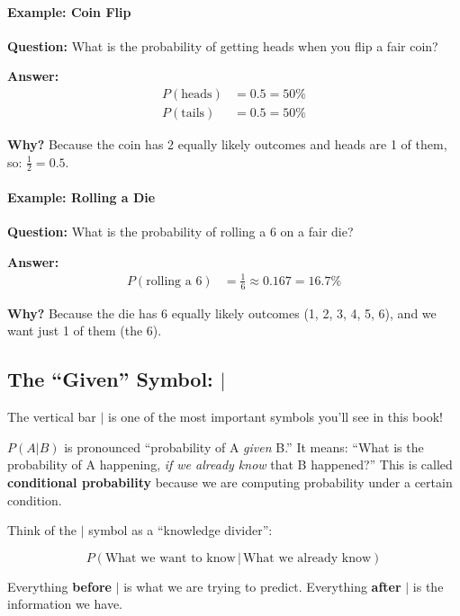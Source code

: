 \begin{chapterenv}
\paragraph{Example: Coin Flip}

\textbf{Question:} What is the probability of getting heads when you flip a fair coin?

\textbf{Answer:}
\begin{align*}
P(\text{heads}) &= 0.5 = 50\% \\
P(\text{tails}) &= 0.5 = 50\%
\end{align*}

\textbf{Why?} Because the coin has 2 equally likely outcomes and heads are 1 of them, so: $\frac{1}{2} = 0.5$.

\paragraph{Example: Rolling a Die}

\textbf{Question:} What is the probability of rolling a 6 on a fair die?

\textbf{Answer:}
\begin{align*}
P(\text{rolling a 6}) &= \frac{1}{6} \approx 0.167 = 16.7\%
\end{align*}

\textbf{Why?} Because the die has 6 equally likely outcomes (1, 2, 3, 4, 5, 6), and we want just 1 of them (the 6).

\subsection{The ``Given'' Symbol: $|$}

\begin{tipbox}
The vertical bar $|$ is one of the most important symbols you'll see in this book!
\end{tipbox}

$P(A | B)$ is pronounced ``probability of A \textit{given} B.'' It means: ``What is the probability of A happening, \textit{if we already know} that B happened?'' This is called \textbf{conditional probability} because we are computing probability under a certain condition.

Think of the $|$ symbol as a ``knowledge divider'':

\[P(\text{What we want to know} \,|\, \text{What we already know})\]

Everything \textbf{before} $|$ is what we are trying to predict. Everything \textbf{after} $|$ is the information we have.


\end{chapterenv}
